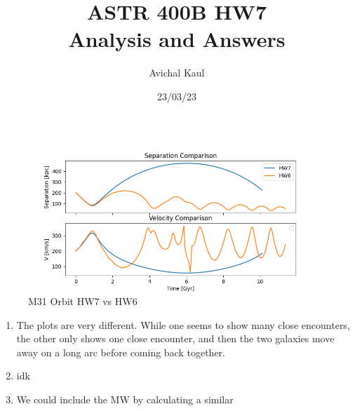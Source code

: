 \documentclass{article}
\title{ASTR 400B HW7 \\ Analysis and Answers}
\author{Avichal Kaul}
\date{23/03/23}
\begin{document}
	\maketitle

\begin{figure}[htpb]
	\centering
	\includegraphics[width=1\textwidth]{../fig.png}
	\caption{M31 Orbit HW7 vs HW6}
	\label{fig:}
\end{figure}	
\begin{enumerate}
	\item The plots are very different. While one seems to show many close encounters, the other only shows one close encounter, and then the two galaxies move away on a long arc before coming back together.
	\item idk
	\item We could include the MW by calculating a similar 
\end{enumerate}
\end{document}
